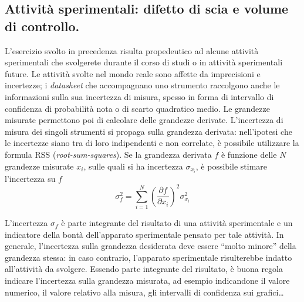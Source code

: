 \subsection{Attività sperimentali: difetto di scia e volume di controllo.}

L'esercizio svolto in precedenza risulta propedeutico ad alcune attività sperimentali
 che svolgerete durante il corso di studi o in attività sperimentali future.
Le attività svolte nel mondo reale sono affette da imprecisioni e incertezze; i 
 \textit{datasheet} che accompagnano uno strumento raccolgono anche le informazioni
 sulla sua incertezza di misura, spesso in forma di intervallo di confidenza di 
 probabilità nota o di scarto quadratico medio.
Le grandezze misurate permettono poi di calcolare delle grandezze derivate. L'incertezza
 di misura dei singoli strumenti si propaga sulla grandezza derivata: nell'ipotesi che
 le incertezze siano tra di loro indipendenti e non correlate, è possibile utilizzare
 la formula RSS (\textit{root-sum-squares}). Se la grandezza derivata $f$ è funzione
 delle $N$ grandezze misurate $x_i$, sulle quali si ha incertezza $\sigma_{x_i}$, è possibile
 stimare l'incertezza su $f$
\begin{equation}
  \sigma_f^2 = \sum_{i=1}^{N} \left( \dfrac{\partial f}{\partial x_i} \right)^2 \sigma_{x_i}^2
\end{equation}

L'incertezza $\sigma_f$ è parte integrante del risultato di una attività sperimentale
 e un indicatore della bontà dell'apparato sperimentale pensato per tale attività.
 In generale, l'incertezza sulla grandezza desiderata deve essere ``molto minore'' della
 grandezza stessa: in caso contrario, l'apparato sperimentale risulterebbe indatto 
 all'attività da svolgere.
Essendo parte integrante del risultato, è buona regola indicare l'incertezza sulla grandezza
 misurata, ad esempio indicandone il valore numerico, il valore relativo alla misura,
 gli intervalli di confidenza sui grafici\dots

